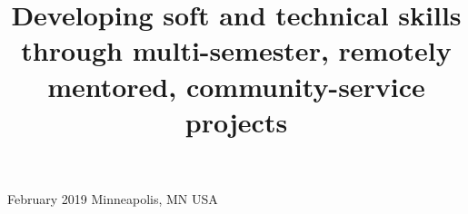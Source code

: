 



  {February 2019}
  {Minneapolis, MN USA} 





\title[Multi-semester, remotely mentored, community service projects]{Developing soft and technical skills through multi-semester, remotely mentored, community-service projects}
